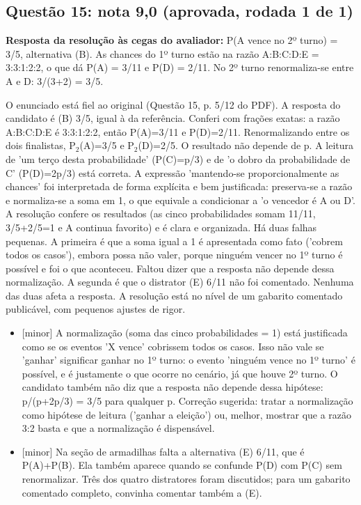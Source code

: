 \documentclass{article}%
\begin{document}
\subsection*{Questão 15: nota 9,0 (aprovada, rodada 1 de 1)}%
\textbf{Resposta da resolução às cegas do avaliador:} P(A vence no 2º turno) = 3/5, alternativa (B). As chances do 1º turno estão na razão A:B:C:D:E = 3:3:1:2:2, o que dá P(A) = 3/11 e P(D) = 2/11. No 2º turno renormaliza{-}se entre A e D: 3/(3+2) = 3/5.\par %
O enunciado está fiel ao original (Questão 15, p. 5/12 do PDF). A resposta do candidato é (B) 3/5, igual à da referência. Conferi com frações exatas: a razão A:B:C:D:E é 3:3:1:2:2, então P(A)=3/11 e P(D)=2/11. Renormalizando entre os dois finalistas, P$_{2}$(A)=3/5 e P$_{2}$(D)=2/5. O resultado não depende de p. A leitura de 'um terço desta probabilidade' (P(C)=p/3) e de 'o dobro da probabilidade de C' (P(D)=2p/3) está correta. A expressão 'mantendo{-}se proporcionalmente as chances' foi interpretada de forma explícita e bem justificada: preserva{-}se a razão e normaliza{-}se a soma em 1, o que equivale a condicionar a 'o vencedor é A ou D'. A resolução confere os resultados (as cinco probabilidades somam 11/11, 3/5+2/5=1 e A continua favorito) e é clara e organizada. Há duas falhas pequenas. A primeira é que a soma igual a 1 é apresentada como fato ('cobrem todos os casos'), embora possa não valer, porque ninguém vencer no 1º turno é possível e foi o que aconteceu. Faltou dizer que a resposta não depende dessa normalização. A segunda é que o distrator (E) 6/11 não foi comentado. Nenhuma das duas afeta a resposta. A resolução está no nível de um gabarito comentado publicável, com pequenos ajustes de rigor.%
\begin{itemize}%
\item%
{[}minor{]} A normalização (soma das cinco probabilidades = 1) está justificada como se os eventos 'X vence' cobrissem todos os casos. Isso não vale se 'ganhar' significar ganhar no 1º turno: o evento 'ninguém vence no 1º turno' é possível, e é justamente o que ocorre no cenário, já que houve 2º turno. O candidato também não diz que a resposta não depende dessa hipótese: p/(p+2p/3) = 3/5 para qualquer p. Correção sugerida: tratar a normalização como hipótese de leitura ('ganhar a eleição') ou, melhor, mostrar que a razão 3:2 basta e que a normalização é dispensável.%
\item%
{[}minor{]} Na seção de armadilhas falta a alternativa (E) 6/11, que é P(A)+P(B). Ela também aparece quando se confunde P(D) com P(C) sem renormalizar. Três dos quatro distratores foram discutidos; para um gabarito comentado completo, convinha comentar também a (E).%
\end{itemize}%
\end{document}
